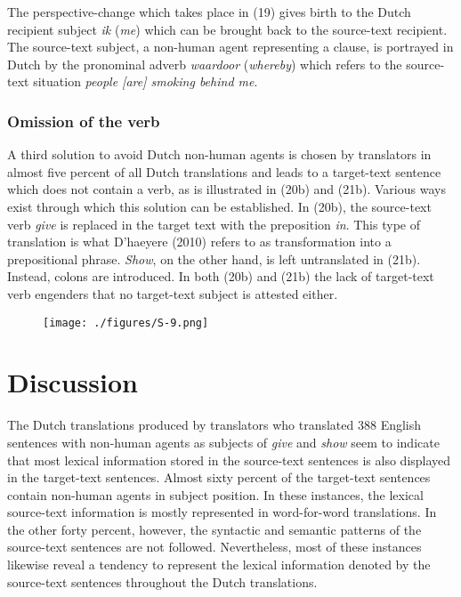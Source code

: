 \documentclass[output=paper]{LSP/langsci}
\begin{document}
The perspective-change which takes place in (19) gives birth to the Dutch recipient subject \textit{ik} (\textit{me}) which can be brought back to the source-text recipient. The source-text subject, a non-human agent representing a clause, is portrayed in Dutch by the pronominal adverb \textit{waardoor} (\textit{whereby}) which refers to the source-text situation \textit{people [are] smoking behind me}.
  

\subsubsection{Omission of the verb}

A third solution to avoid Dutch non-human agents is chosen by translators in almost five percent of all Dutch translations and leads to a target-text sentence which does not contain a verb, as is illustrated in (20b) and (21b). Various ways exist through which this solution can be established. In (20b), the source-text verb \textit{give} is replaced in the target text with the preposition \textit{in}. This type of translation is what D’haeyere (2010) refers to as transformation into a prepositional phrase. \textit{Show}, on the other hand, is left untranslated in (21b). Instead, colons are introduced. In both (20b) and (21b) the lack of target-text verb engenders that no target-text subject is attested either.     

\begin{figure}
\texttt{[image: ./figures/S-9.png]}
\end{figure}


\section{Discussion}

The Dutch translations produced by translators who translated 388 English sentences with non-human agents as subjects of \textit{give} and \textit{show} seem to indicate that most lexical information stored in the source-text sentences is also displayed in the target-text sentences. Almost sixty percent of the target-text sentences contain non-human agents in subject position. In these instances, the lexical source-text information is mostly represented in word-for-word translations. In the other forty percent, however, the syntactic and semantic patterns of the source-text sentences are not followed. Nevertheless, most of these instances likewise reveal a tendency to represent the lexical information denoted by the source-text sentences throughout the Dutch translations.
\end{document}
